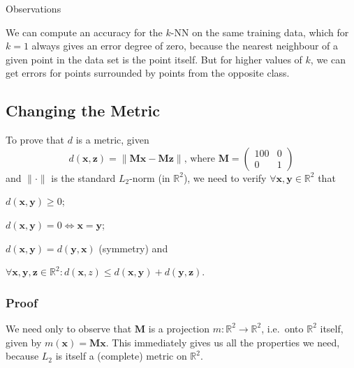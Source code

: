 \documentclass{article}
\newcommand{\vect}[1]{\ensuremath{\boldsymbol{\mathbf{#1}}}\xspace}
\begin{document}
Observations

We can compute an accuracy for the $k$-NN on the same training data, which for $k = 1$ always gives an error degree of zero, because the nearest neighbour of a given point in the data set is the point itself. But for higher values of $k$, we can get errors for points surrounded by points from the opposite class.


\subsection{Changing the Metric}

To prove that $d$ is a metric, given
\[
d(\vect{x},\vect{z}) = \|\vect{M}\vect{x} - \vect{M}\vect{z}\|\text{,
  where } \vect{M} = \begin{pmatrix} 100 & 0 \\ 0 & 1\end{pmatrix}
\]
and $\|\cdot\|$ is the standard $L_2$-norm (in $\mathbb{R}^2$), we
need to verify $\forall \vect{x},\vect{y}\in \mathbb{R}^2$ that
\begin{inparaenum}[1)]
  \item $d(\vect{x},\vect{y}) \geq 0$; 
  \item $d(\vect{x},\vect{y}) = 0 \Leftrightarrow \vect{x} = \vect{y}$;
  \item $d(\vect{x},\vect{y}) =  d(\vect{y},\vect{x})$ (symmetry) and
  \item $\forall \vect{x},\vect{y},\vect{z} \in \mathbb{R}^2 : d(\vect{x},z) \leq d(\vect{x},\vect{y}) + d(\vect{y},\vect{z})$.
\end{inparaenum}

\subsubsection{Proof}

We need only to observe that $\vect{M}$ is a projection $m : \mathbb{R}^2 \rightarrow \mathbb{R}^2$, i.e.\ onto $\mathbb{R}^2$ itself, given by $m(\vect{x}) = \vect{M}\vect{x}$. This immediately gives us all the properties we need, because $L_2$ is itself a (complete) metric on $\mathbb{R}^2$.
\end{document}
